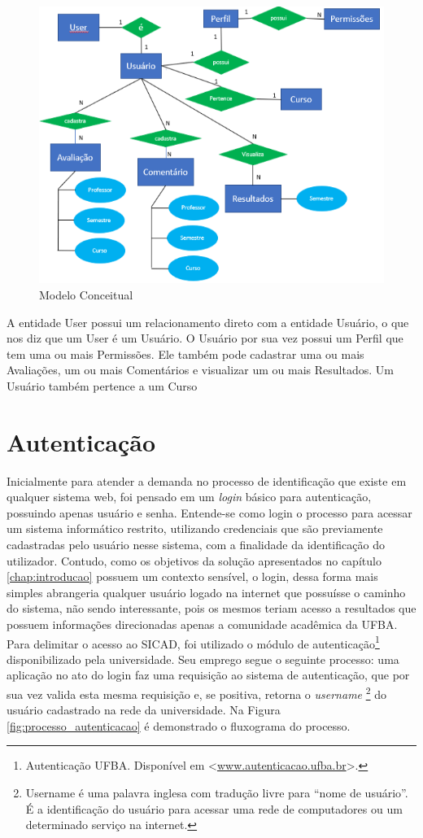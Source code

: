 \documentclass[12pt, a4paper]{report}
\begin{document}
\begin{figure}
\centering
\includegraphics{modelo_conceitual.png}
\caption{Modelo Conceitual}
\label{fig:modelo_conceitual}
\end{figure}
 
A entidade User possui um relacionamento direto com a  entidade Usuário, o que nos diz que um User é um Usuário. O Usuário por sua vez possui um Perfil que tem uma ou mais Permissões. Ele também pode cadastrar uma ou mais Avaliações, um ou mais Comentários e visualizar um ou mais Resultados. Um Usuário também pertence a um Curso

\section{Autenticação}
\label{section:autenticacao}
Inicialmente para atender a demanda no processo de identificação que existe em qualquer sistema web, foi pensado em um \textit{login} básico para autenticação, possuindo apenas usuário e senha. Entende-se como login o processo para acessar um sistema informático restrito, utilizando credenciais que são previamente cadastradas pelo usuário nesse sistema, com a finalidade da identificação do utilizador. Contudo, como os objetivos da solução apresentados no capítulo \ref{chap:introducao} possuem um contexto sensível, o login, dessa forma mais simples abrangeria qualquer usuário logado na internet que possuísse o caminho do sistema, não sendo interessante, pois os mesmos teriam acesso a resultados que possuem informações direcionadas apenas a comunidade acadêmica da UFBA.
Para delimitar o acesso ao \ac{SICAD}, foi utilizado o módulo de autenticação\footnote{Autenticação UFBA. Disponível em <\url{www.autenticacao.ufba.br}>.} disponibilizado pela universidade. Seu emprego segue o seguinte processo: uma aplicação no ato do login faz uma requisição ao sistema de autenticação, que por sua vez valida esta mesma requisição e, se positiva, retorna o \textit{username} \footnote{Username é uma palavra inglesa com tradução livre para “nome de usuário”. É a identificação do usuário para acessar uma rede de computadores ou um determinado serviço na internet.} do usuário cadastrado na rede da universidade. Na Figura \ref{fig:processo_autenticacao} é demonstrado o fluxograma do processo.
\end{document}
